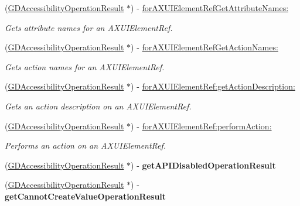 \begin{DoxyCompactItemize}
(\hyperlink{interface_g_d_accessibility_operation_result}{GDAccessibilityOperationResult} $\ast$) -\/ \hyperlink{interface_g_d_accessibility_manager_a25f20499558c7b5bbd4fccca578fbefe}{forAXUIElementRefGetAttributeNames:}
\begin{DoxyCompactList}\small\item\em Gets attribute names for an AXUIElementRef. \item\end{DoxyCompactList}\item 
(\hyperlink{interface_g_d_accessibility_operation_result}{GDAccessibilityOperationResult} $\ast$) -\/ \hyperlink{interface_g_d_accessibility_manager_af7ed61beb0c1683b0e8a766ecd977547}{forAXUIElementRefGetActionNames:}
\begin{DoxyCompactList}\small\item\em Gets action names for an AXUIElementRef. \item\end{DoxyCompactList}\item 
(\hyperlink{interface_g_d_accessibility_operation_result}{GDAccessibilityOperationResult} $\ast$) -\/ \hyperlink{interface_g_d_accessibility_manager_aec013555193c1fade98e5ae3e36f953b}{forAXUIElementRef:getActionDescription:}
\begin{DoxyCompactList}\small\item\em Gets an action description on an AXUIElementRef. \item\end{DoxyCompactList}\item 
(\hyperlink{interface_g_d_accessibility_operation_result}{GDAccessibilityOperationResult} $\ast$) -\/ \hyperlink{interface_g_d_accessibility_manager_a365dbd94f222b04c86141c83c1542e68}{forAXUIElementRef:performAction:}
\begin{DoxyCompactList}\small\item\em Performs an action on an AXUIElementRef. \item\end{DoxyCompactList}\item 
\hypertarget{interface_g_d_accessibility_manager_a47b0eb8fca2a6ca2ed9352ff287956d8}{
(\hyperlink{interface_g_d_accessibility_operation_result}{GDAccessibilityOperationResult} $\ast$) -\/ {\bfseries getAPIDisabledOperationResult}}
\label{interface_g_d_accessibility_manager_a47b0eb8fca2a6ca2ed9352ff287956d8}

\item 
\hypertarget{interface_g_d_accessibility_manager_abee89ff43cfda7232f761f9855c7dddc}{
(\hyperlink{interface_g_d_accessibility_operation_result}{GDAccessibilityOperationResult} $\ast$) -\/ {\bfseries getCannotCreateValueOperationResult}}
\label{interface_g_d_accessibility_manager_abee89ff43cfda7232f761f9855c7dddc}

\end{DoxyCompactItemize}
